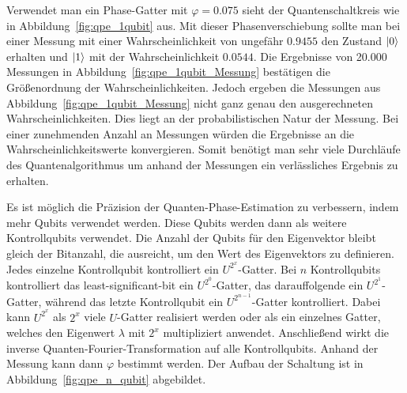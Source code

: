 Verwendet man ein Phase-Gatter mit \(\varphi  = 0.075\) sieht der Quantenschaltkreis wie in Abbildung~\ref{fig:qpe_1qubit} aus.
Mit dieser Phasenverschiebung sollte man bei einer Messung mit einer Wahrscheinlichkeit von ungefähr
\(0.9455\) den Zustand \(\ket{0}\) erhalten und \(\ket{1}\) mit der Wahrscheinlichkeit \(0.0544\).
Die Ergebnisse von 20.000 Messungen in Abbildung~\ref{fig:qpe_1qubit_Messung} bestätigen die Größenordnung der Wahrscheinlichkeiten.
Jedoch ergeben die Messungen aus Abbildung~\ref{fig:qpe_1qubit_Messung} nicht ganz genau den ausgerechneten Wahrscheinlichkeiten.
Dies liegt an der probabilistischen Natur der Messung.
Bei einer zunehmenden Anzahl an Messungen würden die Ergebnisse an die Wahrscheinlichkeitswerte konvergieren.
Somit benötigt man sehr viele Durchläufe des Quantenalgorithmus um anhand der Messungen ein verlässliches Ergebnis zu erhalten.

Es ist möglich die Präzision der Quanten-Phase-Estimation zu verbessern, 
indem mehr Qubits verwendet werden.
Diese Qubits werden dann als weitere Kontrollqubits verwendet.
Die Anzahl der Qubits für den Eigenvektor bleibt gleich der Bitanzahl, 
die ausreicht, um den Wert des Eigenvektors zu definieren.
Jedes einzelne Kontrollqubit kontrolliert ein \(U^{2^x}\)-Gatter.
Bei \(n\) Kontrollqubits kontrolliert das least-significant-bit ein \(U^{2^0}\)-Gatter,
das darauffolgende ein \(U^{2^1}\)-Gatter,
während das letzte Kontrollqubit ein \(U^{2^{n-1}}\)-Gatter kontrolliert.
Dabei kann \(U^{2^x}\) als \(2^x\) viele \(U\)-Gatter realisiert werden oder 
als ein einzelnes Gatter, welches den Eigenwert \(\lambda\) mit \(2^x\) multipliziert anwendet.
Anschließend wirkt die inverse Quanten-Fourier-Transformation auf alle Kontrollqubits.
Anhand der Messung kann dann \(\varphi\) bestimmt werden.
Der Aufbau der Schaltung ist in Abbildung~\ref{fig:qpe_n_qubit} abgebildet.

